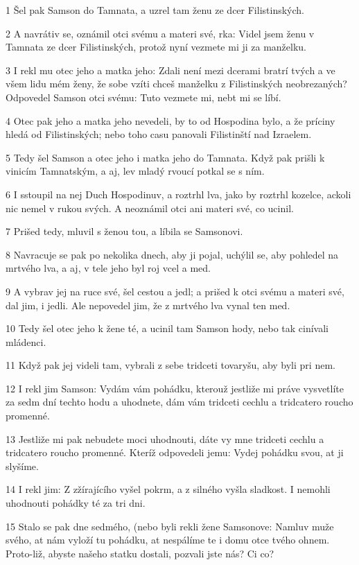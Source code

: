 \par 1 Šel pak Samson do Tamnata, a uzrel tam ženu ze dcer Filistinských.
\par 2 A navrátiv se, oznámil otci svému a materi své, rka: Videl jsem ženu v Tamnata ze dcer Filistinských, protož nyní vezmete mi ji za manželku.
\par 3 I rekl mu otec jeho a matka jeho: Zdali není mezi dcerami bratrí tvých a ve všem lidu mém ženy, že sobe vzíti chceš manželku z Filistinských neobrezaných? Odpovedel Samson otci svému: Tuto vezmete mi, nebt mi se líbí.
\par 4 Otec pak jeho a matka jeho nevedeli, by to od Hospodina bylo, a že príciny hledá od Filistinských; nebo toho casu panovali Filistinští nad Izraelem.
\par 5 Tedy šel Samson a otec jeho i matka jeho do Tamnata. Když pak prišli k vinicím Tamnatským, a aj, lev mladý rvoucí potkal se s ním.
\par 6 I sstoupil na nej Duch Hospodinuv, a roztrhl lva, jako by roztrhl kozelce, ackoli nic nemel v rukou svých. A neoznámil otci ani materi své, co ucinil.
\par 7 Prišed tedy, mluvil s ženou tou, a líbila se Samsonovi.
\par 8 Navracuje se pak po nekolika dnech, aby ji pojal, uchýlil se, aby pohledel na mrtvého lva, a aj, v tele jeho byl roj vcel a med.
\par 9 A vybrav jej na ruce své, šel cestou a jedl; a prišed k otci svému a materi své, dal jim, i jedli. Ale nepovedel jim, že z mrtvého lva vynal ten med.
\par 10 Tedy šel otec jeho k žene té, a ucinil tam Samson hody, nebo tak cinívali mládenci.
\par 11 Když pak jej videli tam, vybrali z sebe tridceti tovaryšu, aby byli pri nem.
\par 12 I rekl jim Samson: Vydám vám pohádku, kterouž jestliže mi práve vysvetlíte za sedm dní techto hodu a uhodnete, dám vám tridceti cechlu a tridcatero roucho promenné.
\par 13 Jestliže mi pak nebudete moci uhodnouti, dáte vy mne tridceti cechlu a tridcatero roucho promenné. Kteríž odpovedeli jemu: Vydej pohádku svou, at ji slyšíme.
\par 14 I rekl jim: Z zžírajícího vyšel pokrm, a z silného vyšla sladkost. I nemohli uhodnouti pohádky té za tri dni.
\par 15 Stalo se pak dne sedmého, (nebo byli rekli žene Samsonove: Namluv muže svého, at nám vyloží tu pohádku, at nespálíme te i domu otce tvého ohnem. Proto-liž, abyste našeho statku dostali, pozvali jste nás? Ci co?
